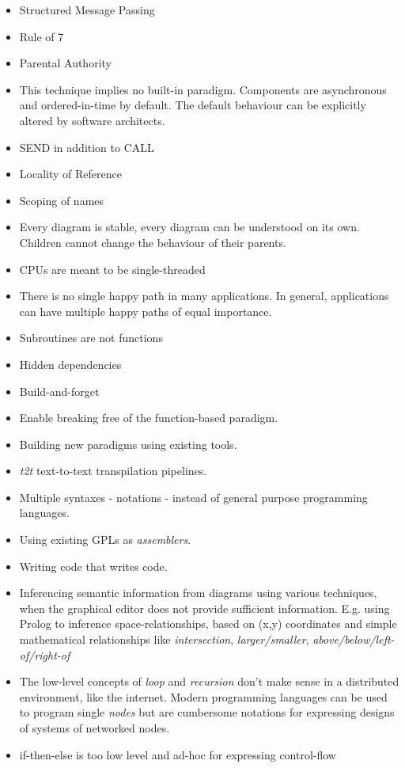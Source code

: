 \documentclass[10pt,anonymous,review]{acmart}
\begin{document}
\begin{itemize}
\item Structured Message Passing
\item Rule of 7
\item Parental Authority
\item This technique implies no built-in paradigm. Components are asynchronous and ordered-in-time by default. 
The default behaviour can be explicitly altered by software architects.
\item SEND in addition to CALL
\item Locality of Reference
\item Scoping of names
\item Every diagram is stable, every diagram can be understood on its own.
Children cannot change the behaviour of their parents.
\item CPUs are meant to be single-threaded
\item There is no single happy path in many applications.
In general, applications can have multiple happy paths of equal importance.
\item Subroutines are not functions
\item Hidden dependencies
\item Build-and-forget
\item Enable breaking free of the function-based
paradigm.
\item Building new paradigms using existing tools.
\item \emph{t2t} text-to-text transpilation pipelines.
\item Multiple syntaxes - notations - instead of general purpose programming languages.
\item Using existing GPLs as \emph{assemblers}.
\item Writing code that writes code.
\item Inferencing semantic information from diagrams using various techniques, when 
the graphical editor does not provide sufficient information. E.g. using Prolog to inference
space-relationships, based on (x,y) coordinates and simple mathematical relationships 
like \emph{intersection}, \emph{larger/smaller}, \emph{above/below/left-of/right-of}
\item The low-level concepts of \emph{loop} and \emph{recursion} don't make sense in a distributed environment, like the internet. Modern programming languages can be used to program single \emph{nodes} but are cumbersome notations for expressing designs of systems of networked nodes. 
\item if-then-else is too low level and ad-hoc for expressing control-flow
\end{itemize}
\end{document}

